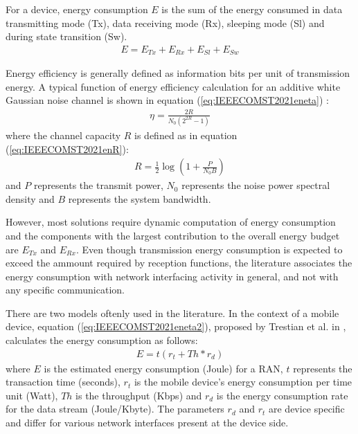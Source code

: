 For a device, energy consumption $E$ is the sum of the energy consumed in data transmitting mode (Tx), data receiving mode (Rx), sleeping mode (Sl) and during state transition (Sw).
\begin{equation}
	\label{eq:IEEECOMST2021encons}
	\begin{split}
		E = {E_{Tx}} + {E_{Rx}} + {E_{Sl}} + {E_{Sw}}
	\end{split}
\end{equation}

Energy efficiency is generally defined as information bits per unit of transmission energy. A typical function of energy efficiency calculation for an additive white Gaussian noise channel is shown in equation (\ref{eq:IEEECOMST2021eneta})
\cite{mcclaning2000}:
\begin{equation}
	\label{eq:IEEECOMST2021eneta}
	\begin{split}
		\eta = \frac{2R}{N_0(2^{2R}-1)}
	\end{split}
\end{equation}
where the channel capacity $R$ is defined as in equation (\ref{eq:IEEECOMST2021enR}):
\begin{equation}
	\label{eq:IEEECOMST2021enR}
	\begin{split}
		R=\frac{1}{2}\log{(1+\frac{P}{N_0B})}
	\end{split}
\end{equation}
and $P$ represents the transmit power, $N_0$ represents the noise power spectral density and $B$ represents the system bandwidth.

However, most solutions require dynamic computation of energy consumption and the components with the largest contribution to the overall energy budget are $E_{Tx}$ and $E_{Rx}$. Even though transmission energy consumption is expected to exceed the ammount required by reception functions, the literature associates the energy consumption with network interfacing activity in general,  and not with any specific communication.

There are two models oftenly used in the literature.
In the context of a mobile device, equation (\ref{eq:IEEECOMST2021eneta2}), proposed by Trestian et al. in \cite{Trestian2013}, calculates the energy consumption as follows:
\begin{equation}
	\label{eq:IEEECOMST2021eneta2}
	\begin{split}
		E = t(r_t + Th*r_d)
	\end{split}
\end{equation}
where $E$ is the estimated energy consumption (Joule) for a RAN, $t$ represents the transaction time (seconds), $r_t$ is the mobile device’s energy consumption per time unit (Watt), $Th$ is the throughput (Kbps) and $r_d$ is the energy consumption rate for the data stream (Joule/Kbyte). The parameters $r_d$ and $r_t$ are device specific and differ for various network interfaces present at the device side.

